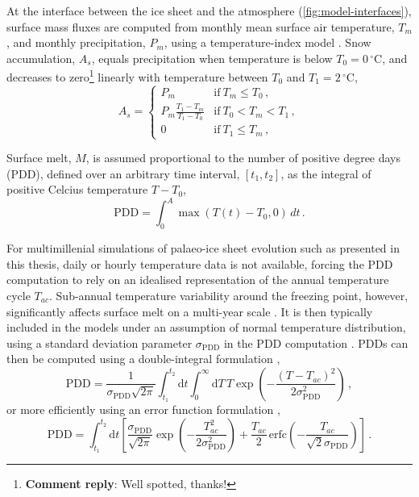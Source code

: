 \documentclass{article}
\newcommand{\renote}[1]{\footnote{\textbf{Comment reply}: #1}}
\newcommand{\PDD}[0]{\mathrm{PDD}}
\newcommand{\sPDD}[0]{\sigma_{\mathrm{PDD}}}
\newcommand{\unit}[1]{\ensuremath{\mathrm{#1}}}
\newcommand{\degree}[0]{\ensuremath{^{\circ}}}
\newcommand{\degC}[0]{\unit{{\degree}C}}
\begin{document}
At the interface between the ice sheet and the atmosphere
(\cref{fig:model-interfaces}),
surface mass fluxes are computed from monthly mean surface air temperature,
$T_m$, and monthly precipitation, $P_m$, using a temperature-index model
\citep[\cref{fig:model-pdd}; cf.][]{Hock.2003}. Snow accumulation, $A_s$,
equals precipitation
when temperature is below ${T_0=0\,\degC}$, and decreases to zero\renote{
    Well spotted, thanks!}
linearly with temperature between $T_0$ and ${T_1=2\,\degC}$,
\begin{equation}
    A_s =
    \begin{cases}
        P_m     & \text{if}\ T_m \le T_0 \,, \\
        P_m \frac{T_1-T_m}{T_1-T_0}
                & \text{if}\ T_0 < T_m < T_1 \,, \\
        0       & \text{if}\ T_1 \le T_m \,,
    \end{cases}
\end{equation}

Surface melt, $M$, is assumed proportional to the number of positive degree
days (PDD), defined over an arbitrary time interval, $[t_1, t_2]$, as the
integral of positive Celcius temperature $T-T_0$,
\begin{equation}
    \mathrm{PDD} = \int_{0}^{A}\max(T(t)-T_0,0)\,dt \,.
\end{equation}

For multimillenial simulations of palaeo-ice sheet evolution such as
presented in this thesis, daily or hourly temperature data is not available,
forcing the PDD computation to rely on an idealised representation of the
annual temperature cycle $T_{ac}$. Sub-annual temperature variability around
the freezing point, however, significantly affects surface melt on a multi-year
scale \citep{Arnold.Mackay.1964}. It is then typically included in the models
under an assumption of normal temperature distribution, using a standard
deviation parameter $\sPDD$ in the PDD computation \citep{Braithwaite.1984}.
PDDs can then be computed using a double-integral formulation
\citep{Reeh.1991},
\begin{equation}
    \PDD = \frac{1}{\sPDD\sqrt{2\pi}}
        \int_{t_1}^{t_2} \mathrm{d}t
        \int_{0}^{\infty} \mathrm{d}T \,
        T \exp\left({-\frac{(T-T_{ac})^2}{2\sPDD^2}}\right) \,,
\end{equation}
or more efficiently using an error function formulation
\citep{Calov.Greve.2005},
\begin{equation}
    \label{eqn:calovgreve}
    \PDD = \int_{t_1}^{t_2} \mathrm{d}t
        \left[\frac{\sPDD}{\sqrt{2\pi}}
                \exp\left({-\frac{T_{ac}^2}{2\sPDD^2}}\right)
              + \frac{T_{ac}}{2} \, \mathrm{erfc}
                \left(-\frac{T_{ac}}{\sqrt{2}\sPDD}\right)\right] \,.
\end{equation}
\end{document}
